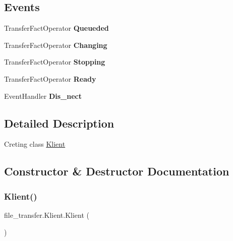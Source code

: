 \subsection*{Events}
\begin{DoxyCompactItemize}
\item 
\mbox{\label{classfile__transfer_1_1_klient_aa3ce53607dc7604fa6ef693b0099877f}} 
Transfer\+Fact\+Operator {\bfseries Queueded}
\item 
\mbox{\label{classfile__transfer_1_1_klient_adfda2eff039ba829c3434b50efd68614}} 
Transfer\+Fact\+Operator {\bfseries Changing}
\item 
\mbox{\label{classfile__transfer_1_1_klient_a561daaf3bc4670ecfa736cc6bc05b8ed}} 
Transfer\+Fact\+Operator {\bfseries Stopping}
\item 
\mbox{\label{classfile__transfer_1_1_klient_acb43fdd608c1996067b0a2a42cb75e97}} 
Transfer\+Fact\+Operator {\bfseries Ready}
\item 
\mbox{\label{classfile__transfer_1_1_klient_a45f976335fa71cfba911a78bebc05003}} 
Event\+Handler {\bfseries Dis\+\_\+nect}
\end{DoxyCompactItemize}


\subsection{Detailed Description}
Creting class \hyperlink{classfile__transfer_1_1_klient}{Klient} 



\subsection{Constructor \& Destructor Documentation}
\mbox{\label{classfile__transfer_1_1_klient_a40e58213cfd0bfd0781da06786610007}} 
\subsubsection{\texorpdfstring{Klient()}{Klient()}\hspace{0.1cm}{\footnotesize\ttfamily [1/2]}}
{\footnotesize\ttfamily file\+\_\+transfer.\+Klient.\+Klient (\begin{DoxyParamCaption}{ }\end{DoxyParamCaption})}



